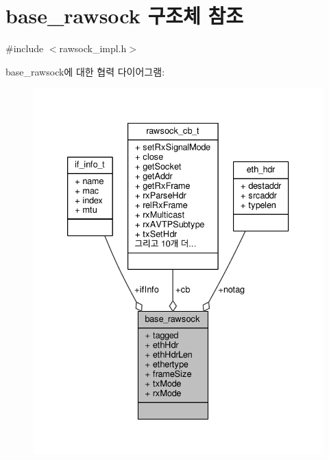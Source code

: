 \hypertarget{structbase__rawsock}{}\section{base\+\_\+rawsock 구조체 참조}
\label{structbase__rawsock}


{\ttfamily \#include $<$rawsock\+\_\+impl.\+h$>$}



base\+\_\+rawsock에 대한 협력 다이어그램\+:
\nopagebreak
\begin{figure}[H]
\begin{center}
\leavevmode
\includegraphics[width=333pt]{structbase__rawsock__coll__graph}
\end{center}
\end{figure}
